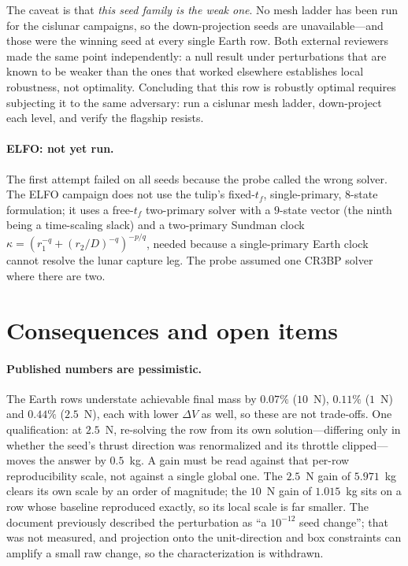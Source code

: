 \documentclass[11pt]{article}
\newcommand{\dV}{\Delta V}
\begin{document}
The caveat is that \emph{this seed family is the weak one}. No mesh ladder has
been run for the cislunar campaigns, so the down-projection seeds are
unavailable---and those were the winning seed at every single Earth row. Both
external reviewers made the same point independently: a null result under
perturbations that are known to be weaker than the ones that worked elsewhere
establishes local robustness, not optimality. Concluding that this row is
robustly optimal requires subjecting it to the same adversary: run a cislunar
mesh ladder, down-project each level, and verify the flagship resists.

\paragraph{ELFO: not yet run.} The first attempt failed on all seeds because
the probe called the wrong solver. The ELFO campaign does not use the tulip's
fixed-$t_f$, single-primary, $8$-state formulation; it uses a free-$t_f$
two-primary solver with a $9$-state vector (the ninth being a time-scaling
slack) and a two-primary Sundman clock
$\kappa = (r_1^{-q} + (r_2/D)^{-q})^{-p/q}$, needed because a single-primary
Earth clock cannot resolve the lunar capture leg. The probe assumed one CR3BP
solver where there are two.

\section{Consequences and open items}
\label{sec:consequences}

\paragraph{Published numbers are pessimistic.} The Earth rows understate
achievable final mass by $0.07\%$ ($10$~N), $0.11\%$ ($1$~N) and $0.44\%$
($2.5$~N), each with lower $\dV$ as well, so these are not trade-offs. One
qualification: at $2.5$~N, re-solving the row from its own solution---differing
only in whether the seed's thrust direction was renormalized and its throttle
clipped---moves the answer by $0.5$~kg. A gain must be read against that
per-row reproducibility scale, not against a single global one. The $2.5$~N
gain of $5.971$~kg clears its own scale by an order of magnitude; the $10$~N
gain of $1.015$~kg sits on a row whose baseline reproduced exactly, so its
local scale is far smaller. The document previously described the perturbation
as ``a $10^{-12}$ seed change''; that was not measured, and projection onto the
unit-direction and box constraints can amplify a small raw change, so the
characterization is withdrawn.
\end{document}

